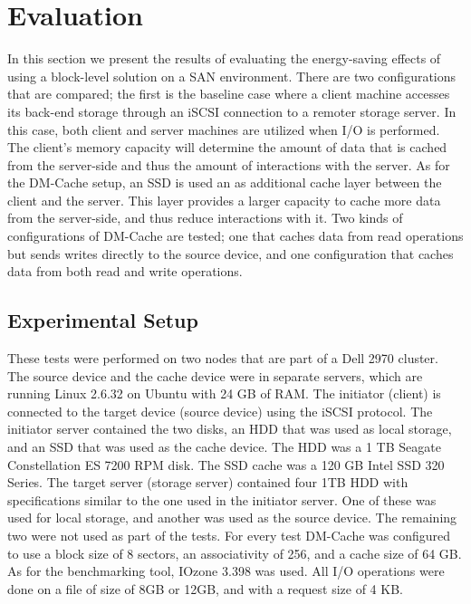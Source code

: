 \section{Evaluation}
\label{sec:evaluation}

In this section we present the results of evaluating the energy-saving effects
of using a block-level solution on a SAN environment. There are two
configurations that are compared; the first is the baseline case where a client
machine accesses its back-end storage through an iSCSI connection to a remoter
storage server. In this case, both client and server machines are utilized when
I/O is performed. The client's memory capacity will determine the amount of data
that is cached from the server-side and thus the amount of interactions with the
server. As for the DM-Cache setup, an SSD is used an as additional cache layer
between the client and the server. This layer provides a larger capacity to
cache more data from the server-side, and thus reduce interactions with it. Two
kinds of configurations of DM-Cache are tested; one that caches data from read
operations but sends writes directly to the source device, and one configuration
that caches data from both read and write operations.

\subsection{Experimental Setup}

These tests were performed on two nodes that are part of a Dell 2970
cluster. The source device and the cache device were in separate servers, which
are running Linux 2.6.32 on Ubuntu with 24 GB of RAM.  The initiator (client) is
connected to the target device (source device) using the iSCSI protocol. The
initiator server contained the two disks, an HDD that was used as local storage,
and an SSD that was used as the cache device. The HDD was a 1 TB Seagate
Constellation ES 7200 RPM disk. The SSD cache was a 120 GB Intel SSD 320
Series. The target server (storage server) contained four 1TB HDD with
specifications similar to the one used in the initiator server. One of these was
used for local storage, and another was used as the source device. The remaining
two were not used as part of the tests. For every test DM-Cache was configured
to use a block size of 8 sectors, an associativity of 256, and a cache size of
64 GB. As for the benchmarking tool, IOzone 3.398 was used. All I/O operations
were done on a file of size of 8GB or 12GB, and with a request size of 4 KB.

